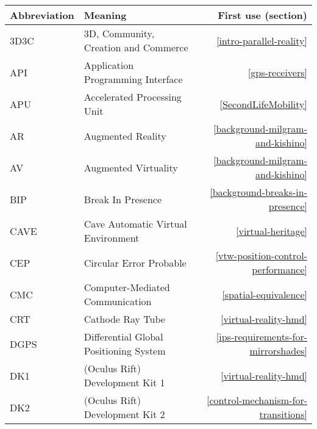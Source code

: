 \begin{center}
\begin{longtable}{l p{8cm} r}

\toprule

\textbf{Abbreviation} & \centering \textbf{Meaning} & \textbf{First use (section)} \\

\midrule


3D3C & \centering 3D, Community, Creation and Commerce & \ref{intro-parallel-reality} \\

API & \centering Application Programming Interface & \ref{gps-receivers} \\

APU & \centering Accelerated Processing Unit & \ref{SecondLifeMobility} \\

AR & \centering Augmented Reality & \ref{background-milgram-and-kishino} \\

AV & \centering Augmented Virtuality & \ref{background-milgram-and-kishino} \\

BIP & \centering Break In Presence & \ref{background-breaks-in-presence} \\

CAVE & \centering Cave Automatic Virtual Environment & \ref{virtual-heritage} \\

CEP & \centering Circular Error Probable & \ref{vtw-position-control-performance} \\

CMC & \centering Computer-Mediated Communication & \ref{spatial-equivalence} \\

CRT & \centering Cathode Ray Tube & \ref{virtual-reality-hmd} \\

DGPS & \centering Differential Global Positioning System & \ref{ips-requirements-for-mirrorshades} \\

DK1 & \centering (Oculus Rift) Development Kit 1 & \ref{virtual-reality-hmd} \\

DK2 & \centering (Oculus Rift) Development Kit 2 & \ref{control-mechanism-for-transitions} \\


\end{longtable}
\end{center}
